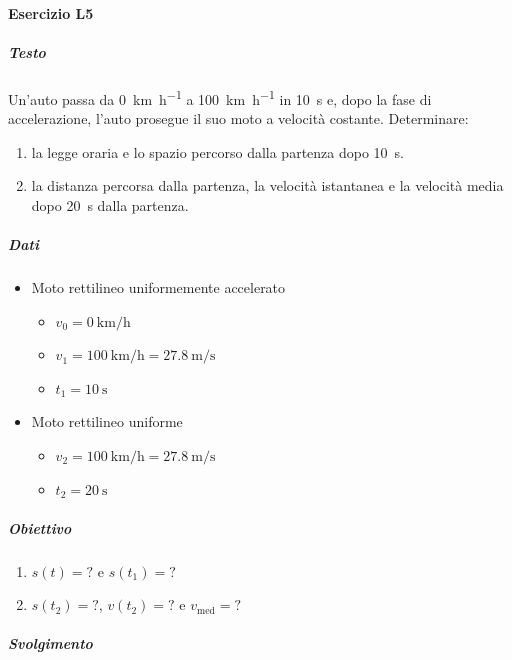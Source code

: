 \documentclass{article}
\begin{document}
\paragraph*{Esercizio L5}
\subparagraph*{Testo}
Un'auto passa da \SI{0}{\kilo\meter\per\hour} a \SI{100}{\kilo\meter\per\hour} in \SI{10}{\second} e, dopo la fase di accelerazione, l'auto prosegue il suo moto a velocità costante. Determinare:
\begin{enumerate}
    \item[(a)] la legge oraria e lo spazio percorso dalla partenza dopo \SI{10}{\second}.
    \item[(b)] la distanza percorsa dalla partenza, la velocità istantanea e la velocità media dopo \SI{20}{\second} dalla partenza.
\end{enumerate}

\subparagraph*{Dati}
\begin{itemize}
    \item Moto rettilineo uniformemente accelerato
          \begin{itemize}
              \item $v_0 = \SI{0}{\kilo\meter\per\hour}$
              \item $v_1 = \SI{100}{\kilo\meter\per\hour} = \SI{27,8}{\meter\per\second}$
              \item $t_1 = \SI{10}{\second}$
          \end{itemize}
    \item Moto rettilineo uniforme
          \begin{itemize}
              \item $v_2 = \SI{100}{\kilo\meter\per\hour} = \SI{27,8}{\meter\per\second}$
              \item $t_2 = \SI{20}{\second}$
          \end{itemize}
\end{itemize}
\subparagraph*{Obiettivo}
\begin{enumerate}
    \item[(a)] $s(t) = ?$ e $s(t_1) = ?$
    \item[(b)] $s(t_2) = ?$, $v(t_2) = ?$ e $v_{\text{med}} = ?$
\end{enumerate}
\subparagraph*{Svolgimento}
\end{document}
